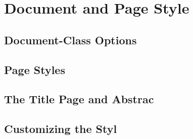 \section{Document and Page Style}
\subsection{Document-Class Options}


\subsection{Page Styles}


\subsection{The Title Page and Abstrac}


\subsection{Customizing the Styl}
